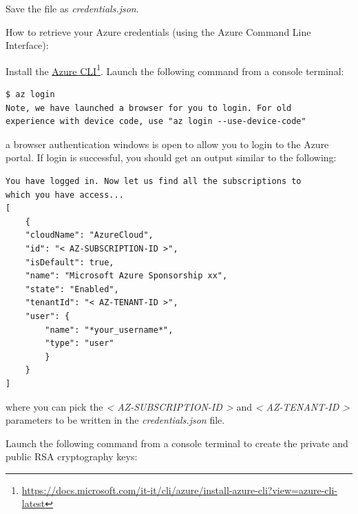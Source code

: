 
Save the file as \emph{credentials.json}.

How to retrieve your Azure credentials (using the Azure Command Line
Interface):

Install the
\href{https://docs.microsoft.com/it-it/cli/azure/install-azure-cli?view=azure-cli-latest}{Azure CLI}\footnote{\url{https://docs.microsoft.com/it-it/cli/azure/install-azure-cli?view=azure-cli-latest}}. Launch the following command from a console terminal:

\begin{verbatim}
$ az login
Note, we have launched a browser for you to login. For old 
experience with device code, use "az login --use-device-code"
\end{verbatim}

a browser authentication windows is open to allow you to login to the
Azure portal. If login is successful, you should get an output similar
to the following:

\begin{verbatim}
You have logged in. Now let us find all the subscriptions to 
which you have access...
[
	{
	"cloudName": "AzureCloud",
	"id": "< AZ-SUBSCRIPTION-ID >",
	"isDefault": true,
	"name": "Microsoft Azure Sponsorship xx",
	"state": "Enabled",
	"tenantId": "< AZ-TENANT-ID >",
	"user": {
		"name": "*your_username*",
		"type": "user"
		}
	}
]
\end{verbatim}

where you can pick the \emph{\textless{} AZ-SUBSCRIPTION-ID
\textgreater{}} and \emph{\textless{} AZ-TENANT-ID \textgreater{}}
parameters to be written in the \emph{credentials.json} file.

Launch the following command from a console terminal to create the
private and public RSA cryptography keys:

